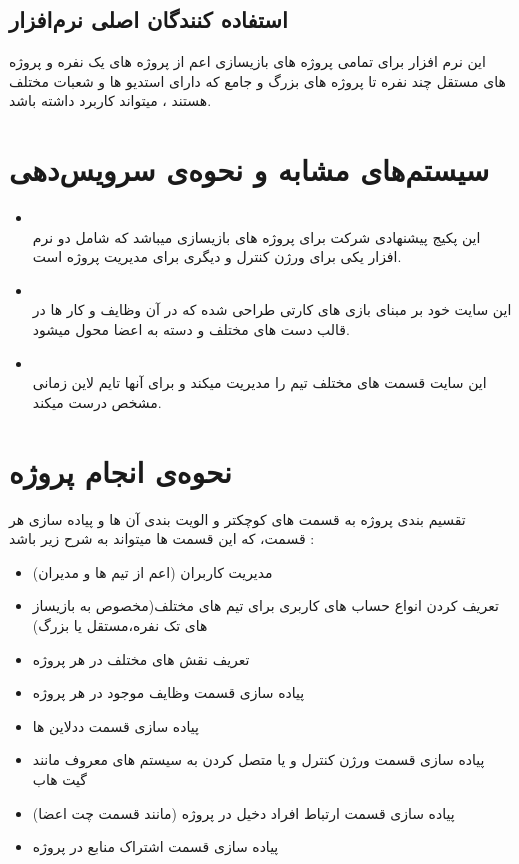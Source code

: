 \documentclass[10pt,a4paper]{article}
\begin{document}
\subsection{
	استفاده کنندگان اصلی نرم‌افزار
}
این نرم افزار برای تمامی پروژه های بازیسازی اعم از پروژه های یک نفره و پروژه های مستقل چند نفره تا پروژه های بزرگ و جامع که دارای استدیو ها و شعبات مختلف هستند ، میتواند کاربرد داشته باشد.

\section{
سیستم‌های مشابه و نحوه‌ی سرویس‌دهی
}
\begin{itemize}
	\item 
	\\
	این پکیج پیشنهادی شرکت 
	برای پروژه های بازیسازی میباشد که شامل دو نرم افزار یکی برای ورژن کنترل و دیگری برای مدیریت پروژه است.
	\item
	\\
	این سایت خود بر مبنای بازی های کارتی طراحی شده که در آن وظایف و کار ها در قالب دست های مختلف و دسته به اعضا محول میشود.
	\item
	\\
این سایت قسمت های مختلف تیم را مدیریت میکند و برای آنها تایم لاین زمانی مشخص درست میکند.
\end{itemize}

\section{
نحوه‌ی انجام پروژه
}
تقسیم بندی پروژه به قسمت های کوچکتر و الویت بندی آن ها و پیاده سازی هر قسمت، که این قسمت ها میتواند به شرح زیر باشد : 
\begin{itemize}
	\item
	مدیریت کاربران (اعم از تیم ها و مدیران)
	\item
	تعریف کردن انواع حساب های کاربری برای تیم های مختلف(مخصوص به بازیساز های تک نفره،مستقل یا بزرگ)
	\item
تعریف نقش های مختلف در هر پروژه
\item
	پیاده سازی قسمت وظایف موجود در هر پروژه 
	\item
	پیاده سازی قسمت ددلاین ها
	\item
	پیاده سازی قسمت ورژن کنترل و یا متصل کردن به سیستم های معروف مانند گیت هاب
	\item
	پیاده سازی قسمت ارتباط افراد دخیل در پروژه (مانند قسمت چت اعضا)
	\item
	پیاده سازی قسمت اشتراک منابع در پروژه
\end{itemize}
\end{document}
